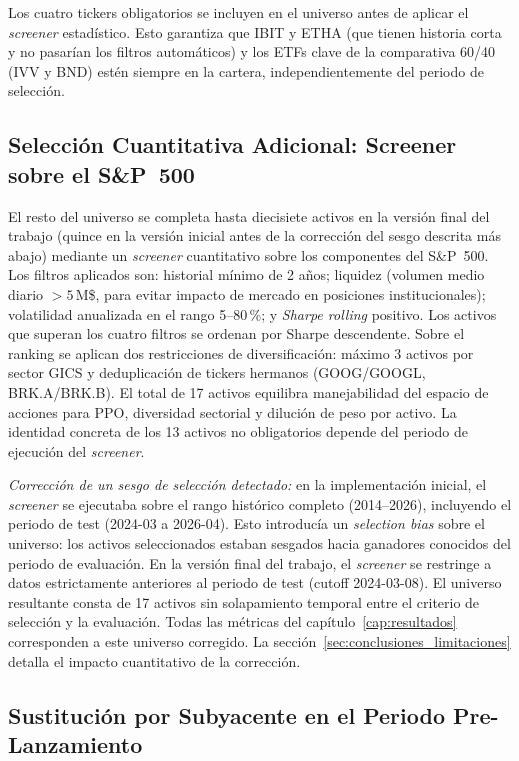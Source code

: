 \documentclass[IB,a4paper]{TFUOC}
\begin{document}
Los cuatro tickers obligatorios se incluyen en el universo antes de aplicar el \textit{screener} estadístico. Esto garantiza que IBIT y ETHA (que tienen historia corta y no pasarían los filtros automáticos) y los ETFs clave de la comparativa 60/40 (IVV y BND) estén siempre en la cartera, independientemente del periodo de selección.

\subsection{Selección Cuantitativa Adicional: Screener sobre el S\&P~500}
\label{sec:universo_screener}

El resto del universo se completa hasta diecisiete activos en la versión final del trabajo (quince en la versión inicial antes de la corrección del sesgo descrita más abajo) mediante un \textit{screener} cuantitativo sobre los componentes del S\&P~500. Los filtros aplicados son: historial mínimo de 2 años; liquidez (volumen medio diario $>5$\,M\$, para evitar impacto de mercado en posiciones institucionales); volatilidad anualizada en el rango 5--80\,\%; y \textit{Sharpe rolling} positivo. Los activos que superan los cuatro filtros se ordenan por Sharpe descendente. Sobre el ranking se aplican dos restricciones de diversificación: máximo 3 activos por sector GICS y deduplicación de tickers hermanos (GOOG/GOOGL, BRK.A/BRK.B). El total de 17 activos equilibra manejabilidad del espacio de acciones para PPO, diversidad sectorial y dilución de peso por activo. La identidad concreta de los 13 activos no obligatorios depende del periodo de ejecución del \textit{screener}.

\noindent\textit{Corrección de un sesgo de selección detectado:} en la implementación inicial, el \textit{screener} se ejecutaba sobre el rango histórico completo (2014--2026), incluyendo el periodo de test (2024-03 a 2026-04). Esto introducía un \textit{selection bias} sobre el universo: los activos seleccionados estaban sesgados hacia ganadores conocidos del periodo de evaluación. En la versión final del trabajo, el \textit{screener} se restringe a datos estrictamente anteriores al periodo de test (cutoff 2024-03-08). El universo resultante consta de 17 activos sin solapamiento temporal entre el criterio de selección y la evaluación. Todas las métricas del capítulo~\ref{cap:resultados} corresponden a este universo corregido. La sección~\ref{sec:conclusiones_limitaciones} detalla el impacto cuantitativo de la corrección.

\subsection{Sustitución por Subyacente en el Periodo Pre-Lanzamiento}
\label{sec:proxy}
\end{document}
